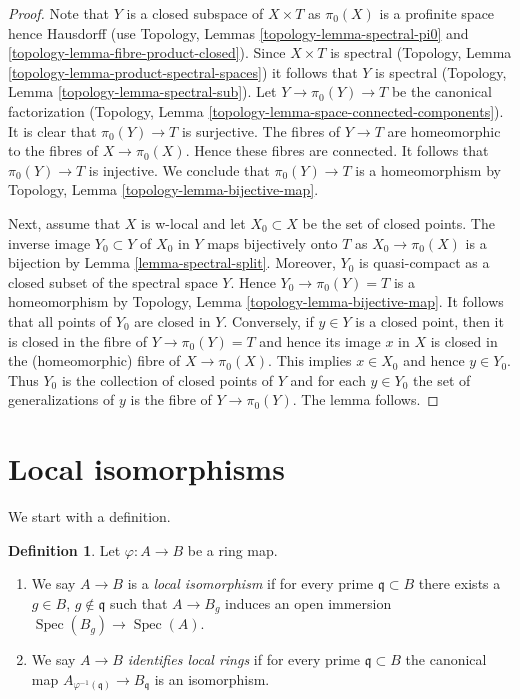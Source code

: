 \documentclass{stacks-project}
\theoremstyle{plain}
\theoremstyle{definition}
\newtheorem{definition}[subsection]{Definition}
\theoremstyle{remark}
\numberwithin{equation}{subsection}
\def\Spec{\mathop{\mathrm{Spec}}}
\begin{document}
\begin{proof}
Note that $Y$ is a closed subspace of $X \times T$ as $\pi_0(X)$
is a profinite space hence Hausdorff
(use Topology, Lemmas \ref{topology-lemma-spectral-pi0} and
\ref{topology-lemma-fibre-product-closed}).
Since $X \times T$ is spectral
(Topology, Lemma \ref{topology-lemma-product-spectral-spaces})
it follows that $Y$ is spectral
(Topology, Lemma \ref{topology-lemma-spectral-sub}).
Let $Y \to \pi_0(Y) \to T$ be the canonical factorization
(Topology, Lemma \ref{topology-lemma-space-connected-components}).
It is clear that $\pi_0(Y) \to T$ is surjective.
The fibres of $Y \to T$ are homeomorphic to the fibres of
$X \to \pi_0(X)$. Hence these fibres are connected. It follows
that $\pi_0(Y) \to T$ is injective. We conclude that $\pi_0(Y) \to T$
is a homeomorphism by
Topology, Lemma \ref{topology-lemma-bijective-map}.

\medskip\noindent
Next, assume that $X$ is w-local and let $X_0 \subset X$ be the
set of closed points. The inverse image $Y_0 \subset Y$ of $X_0$ in
$Y$ maps bijectively onto $T$ as $X_0 \to \pi_0(X)$ is a bijection
by Lemma \ref{lemma-spectral-split}. Moreover, $Y_0$ is quasi-compact
as a closed subset of the spectral space $Y$. Hence
$Y_0 \to \pi_0(Y) = T$ is a homeomorphism by
Topology, Lemma \ref{topology-lemma-bijective-map}.
It follows that all points of $Y_0$ are closed in $Y$.
Conversely, if $y \in Y$ is a closed point, then
it is closed in the fibre of $Y \to \pi_0(Y) = T$
and hence its image $x$ in $X$ is closed in the (homeomorphic) fibre of
$X \to \pi_0(X)$. This implies $x \in X_0$ and hence $y \in Y_0$.
Thus $Y_0$ is the collection of closed points of $Y$
and for each $y \in Y_0$ the set of generalizations of $y$ is
the fibre of $Y \to \pi_0(Y)$. The lemma follows.
\end{proof}




\section{Local isomorphisms}
\label{section-local-isomorphism}

\noindent
We start with a definition.

\begin{definition}
\label{definition-local-isomorphism}
Let $\varphi : A \to B$ be a ring map.
\begin{enumerate}
\item We say $A \to B$ is a {\it local isomorphism} if for every prime
$\mathfrak q \subset B$ there exists a $g \in B$, $g \not \in \mathfrak q$
such that $A \to B_g$ induces an open immersion $\Spec(B_g) \to \Spec(A)$.
\item We say $A \to B$ {\it identifies local rings} if for every prime
$\mathfrak q \subset B$ the canonical map
$A_{\varphi^{-1}(\mathfrak q)} \to B_\mathfrak q$ is an isomorphism.
\end{enumerate}
\end{definition}
\end{document}
